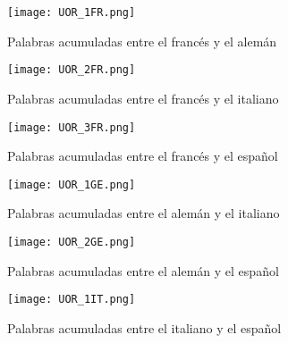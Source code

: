 \begin{figure}[h!]
	\centering
	\texttt{[image: UOR\_1FR.png]}
	\label{fig.SF_FG}
	\caption{Palabras acumuladas entre el francés y el alemán}
\end{figure}

\begin{figure}[h!]
	\centering
	\texttt{[image: UOR\_2FR.png]}
	\label{fig.SF_FI}
	\caption{Palabras acumuladas entre el francés y el italiano}
\end{figure}

\begin{figure}[h!]
	\centering
	\texttt{[image: UOR\_3FR.png]}
	\label{fig.SF_FS}
	\caption{Palabras acumuladas entre el francés y el español}
\end{figure}



\begin{figure}[h!]
	\centering
	\texttt{[image: UOR\_1GE.png]}
	\label{fig.SF_GI}
	\caption{Palabras acumuladas entre el alemán y el italiano}
\end{figure}


\begin{figure}[h!]
	\centering
	\texttt{[image: UOR\_2GE.png]}
	\label{fig.SF_GS}
	\caption{Palabras acumuladas entre el alemán y el español}
\end{figure}


\begin{figure}[h!]
	\centering
	\texttt{[image: UOR\_1IT.png]}
	\label{fig.SF_IS}
	\caption{Palabras acumuladas entre el italiano y el español}
\end{figure}
